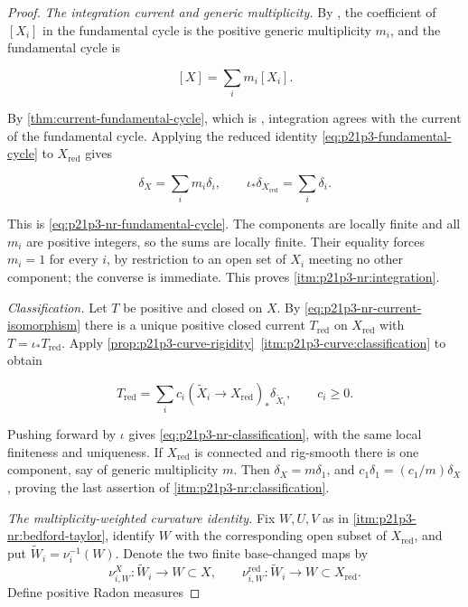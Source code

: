 \begin{proof}
\smallskip
\emph{The integration current and generic multiplicity.}
By \cite[Definition~13.2.5 and \S13.5.2]{CLD25}, the coefficient of
\([X_i]\) in the fundamental cycle is the positive generic multiplicity
\(m_i\), and the fundamental cycle is

\[
                         [X]=\sum_i m_i[X_i].
\]

By \cref{thm:current-fundamental-cycle}, which is
\cite[Proposition~16.6.3]{CLD25}, integration agrees with the current of
the fundamental cycle.  Applying the reduced identity
\eqref{eq:p21p3-fundamental-cycle} to \(X_{\mathrm{red}}\) gives

\[
 \delta_X=\sum_i m_i\delta_i,
 \qquad
 \iota_*\delta_{X_{\mathrm{red}}}=\sum_i\delta_i.
\]

This is \eqref{eq:p21p3-nr-fundamental-cycle}.  The components are locally
finite and all \(m_i\) are positive integers, so the sums are locally
finite.  Their equality forces \(m_i=1\) for every \(i\), by restriction to
an open set of \(X_i\) meeting no other component; the converse is
immediate.  This proves \cref{itm:p21p3-nr:integration}.

\smallskip
\emph{Classification.}
Let \(T\) be positive and closed on \(X\).  By
\eqref{eq:p21p3-nr-current-isomorphism} there is a unique positive closed
current \(T_{\mathrm{red}}\) on \(X_{\mathrm{red}}\) with
\(T=\iota_*T_{\mathrm{red}}\).  Apply
\cref{prop:p21p3-curve-rigidity}\,
\cref{itm:p21p3-curve:classification} to obtain

\[
                  T_{\mathrm{red}}=\sum_i c_i
                    (\widetilde X_i\to X_{\mathrm{red}})_*
                    \delta_{\widetilde X_i},
                  \qquad c_i\geq0.
\]

Pushing forward by \(\iota\) gives
\eqref{eq:p21p3-nr-classification}, with the same local finiteness and
uniqueness.  If \(X_{\mathrm{red}}\) is connected and rig-smooth there is
one component, say of generic multiplicity \(m\).  Then
\(\delta_X=m\delta_1\), and \(c_1\delta_1=(c_1/m)\delta_X\), proving the
last assertion of \cref{itm:p21p3-nr:classification}.

\smallskip
\emph{The multiplicity-weighted curvature identity.}
Fix \(W,U,V\) as in \cref{itm:p21p3-nr:bedford-taylor}, identify \(W\) with
the corresponding open subset of \(X_{\mathrm{red}}\), and put
\(\widetilde W_i=\nu_i^{-1}(W)\).  Denote the two finite base-changed maps by
\[
 \nu_{i,W}^{X}:\widetilde W_i\longrightarrow W\subset X,
 \qquad
 \nu_{i,W}^{\mathrm{red}}:\widetilde W_i\longrightarrow
                         W\subset X_{\mathrm{red}}.
\]
Define positive Radon measures


\end{proof}
